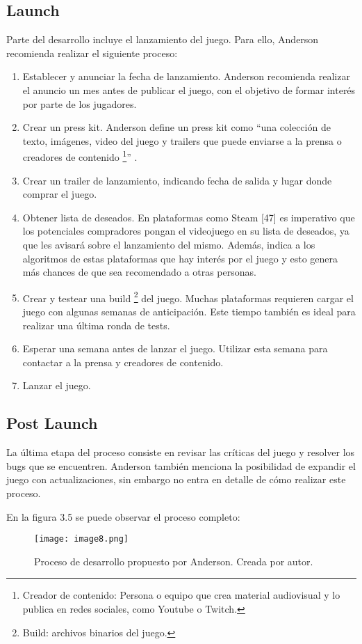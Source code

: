 \subsection{Launch}
Parte del desarrollo incluye el lanzamiento del juego. Para ello, Anderson recomienda realizar el siguiente proceso:
\begin{enumerate}
  \item Establecer y anunciar la fecha de lanzamiento. Anderson recomienda realizar el anuncio un mes antes de publicar el juego, con el objetivo de formar interés por parte de los jugadores.
  \item Crear un press kit. Anderson define un press kit como “una colección de texto, imágenes, video del juego y trailers que puede enviarse a la prensa o creadores de contenido \footnote{Creador de contenido: Persona o equipo que crea material audiovisual y lo publica en redes sociales, como Youtube o Twitch.}” \cite{andersonProductionPointHow2023}.
  \item Crear un trailer de lanzamiento, indicando fecha de salida y lugar donde comprar el juego.
  \item Obtener lista de deseados. En plataformas como Steam [47] es imperativo que los potenciales compradores pongan el videojuego en su lista de deseados, ya que les avisará sobre el lanzamiento del mismo. Además, indica a los algoritmos de estas plataformas que hay interés por el juego y esto genera más chances de que sea recomendado a otras personas.
  \item Crear y testear una build \footnote{Build: archivos binarios del juego.} del juego. Muchas plataformas requieren cargar el juego con algunas semanas de anticipación. Este tiempo también es ideal para realizar una última ronda de tests.
  \item Esperar una semana antes de lanzar el juego. Utilizar esta semana para contactar a la prensa y creadores de contenido.
  \item Lanzar el juego.
\end{enumerate}
%
%
\subsection{Post Launch}
\par La última etapa del proceso consiste en revisar las críticas del juego y resolver los bugs que se encuentren. Anderson también menciona la posibilidad de expandir el juego con actualizaciones, sin embargo no entra en detalle de cómo realizar este proceso.
\bigbreak
\par En la figura 3.5 se puede observar el proceso completo:
\begin{figure}[H]
  \centering
  \texttt{[image: image8.png]}
  \caption{Proceso de desarrollo propuesto por Anderson. Creada por autor.}
  \label{fig:x proceso de desarrollo Anderson}
\end{figure}
